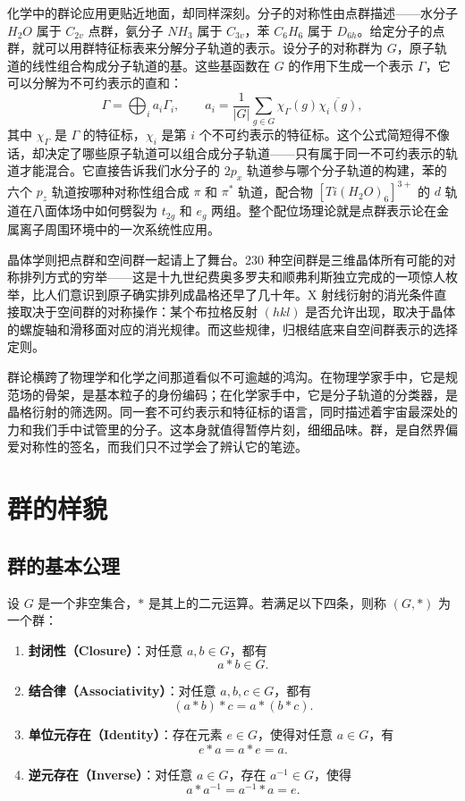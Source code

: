 \documentclass[UTF8]{ctexbook}
\begin{document}
化学中的群论应用更贴近地面，却同样深刻。分子的对称性由点群描述——水分子 $H_2O$ 属于 $C_{2v}$ 点群，氨分子 $NH_3$ 属于 $C_{3v}$，苯 $C_6H_6$ 属于 $D_{6h}$。给定分子的点群，就可以用群特征标表来分解分子轨道的表示。设分子的对称群为 $G$，原子轨道的线性组合构成分子轨道的基。这些基函数在 $G$ 的作用下生成一个表示 $\Gamma$，它可以分解为不可约表示的直和：
\[
\Gamma=\bigoplus_i a_i\Gamma_i,\qquad a_i=\frac{1}{|G|}\sum_{g\in G}\chi_\Gamma(g)\overline{\chi_i(g)},
\]
其中 $\chi_\Gamma$ 是 $\Gamma$ 的特征标，$\chi_i$ 是第 $i$ 个不可约表示的特征标。这个公式简短得不像话，却决定了哪些原子轨道可以组合成分子轨道——只有属于同一不可约表示的轨道才能混合。它直接告诉我们水分子的 $2p_x$ 轨道参与哪个分子轨道的构建，苯的六个 $p_z$ 轨道按哪种对称性组合成 $\pi$ 和 $\pi^*$ 轨道，配合物 $[Ti(H_2O)_6]^{3+}$ 的 $d$ 轨道在八面体场中如何劈裂为 $t_{2g}$ 和 $e_g$ 两组。整个配位场理论就是点群表示论在金属离子周围环境中的一次系统性应用。

晶体学则把点群和空间群一起请上了舞台。230 种空间群是三维晶体所有可能的对称排列方式的穷举——这是十九世纪费奥多罗夫和顺弗利斯独立完成的一项惊人枚举，比人们意识到原子确实排列成晶格还早了几十年。X 射线衍射的消光条件直接取决于空间群的对称操作：某个布拉格反射 $(hkl)$ 是否允许出现，取决于晶体的螺旋轴和滑移面对应的消光规律。而这些规律，归根结底来自空间群表示的选择定则。

群论横跨了物理学和化学之间那道看似不可逾越的鸿沟。在物理学家手中，它是规范场的骨架，是基本粒子的身份编码；在化学家手中，它是分子轨道的分类器，是晶格衍射的筛选网。同一套不可约表示和特征标的语言，同时描述着宇宙最深处的力和我们手中试管里的分子。这本身就值得暂停片刻，细细品味。群，是自然界偏爱对称性的签名，而我们只不过学会了辨认它的笔迹。

\newpage

\section{群的样貌}

\subsection{群的基本公理}

设 $G$ 是一个非空集合，$\ast$ 是其上的二元运算。若满足以下四条，则称 $(G,\ast)$ 为一个群：

\begin{enumerate}
  \item \textbf{封闭性（Closure）}：对任意 $a,b\in G$，都有
  \[
  a\ast b\in G.
  \]

  \item \textbf{结合律（Associativity）}：对任意 $a,b,c\in G$，都有
  \[
  (a\ast b)\ast c = a\ast (b\ast c).
  \]

  \item \textbf{单位元存在（Identity）}：存在元素 $e\in G$，使得对任意 $a\in G$，有
  \[
  e\ast a = a\ast e = a.
  \]

  \item \textbf{逆元存在（Inverse）}：对任意 $a\in G$，存在 $a^{-1}\in G$，使得
  \[
  a\ast a^{-1} = a^{-1}\ast a = e.
  \]
\end{enumerate}
\end{document}
